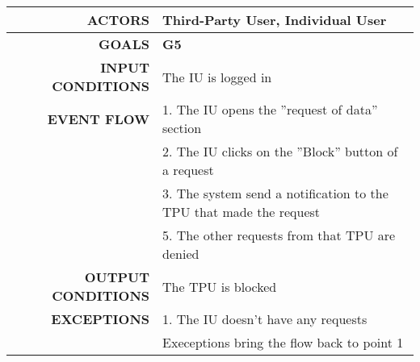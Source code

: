 \begin{table}[h!]
\begin{tabular}{|r|p{3in}|}
\hline
\textbf{ACTORS} & Third-Party User, Individual User\\
\hline
\textbf{GOALS} & \textbf{G5}\\
\hline
\textbf{INPUT CONDITIONS} & The IU is logged in\\
\hline
\textbf{EVENT FLOW} 
&1. The IU opens the ''request of data'' section \\
&2. The IU clicks on the ''Block'' button of a request \\
&3. The system send a notification to the TPU that made the request \\
&5. The other requests from that TPU are denied\\
\hline
\textbf{OUTPUT CONDITIONS} & The TPU is blocked \\
\hline
\textbf{EXCEPTIONS} 
&1. The IU doesn't have any requests \\
&Execeptions bring the flow back to point 1 \\
\hline
\end{tabular}
\end{table}